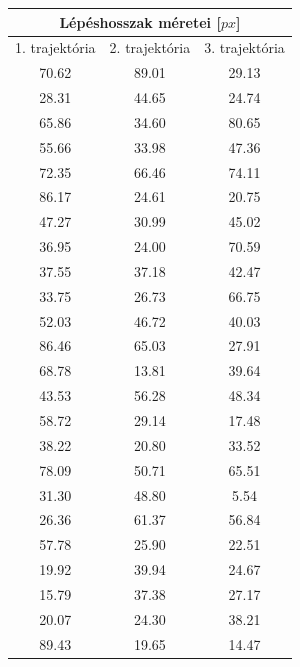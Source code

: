\label{tab:1}
\begin{multicols}{2}
\begin{tabular}{||c|c|c||}
    \toprule
    \multicolumn{3}{||c||}{Lépéshosszak méretei [$px$]} \\
    \hline
    1. trajektória  & 2. trajektória  & 3. trajektória \\ \hline \hline
    70.62           & 89.01           & 29.13          \\ \hline
    28.31           & 44.65           & 24.74          \\ \hline
    65.86           & 34.60           & 80.65          \\ \hline
    55.66           & 33.98           & 47.36          \\ \hline
    72.35           & 66.46           & 74.11          \\ \hline
    86.17           & 24.61           & 20.75          \\ \hline
    47.27           & 30.99           & 45.02          \\ \hline
    36.95           & 24.00           & 70.59          \\ \hline
    37.55           & 37.18           & 42.47          \\ \hline
    33.75           & 26.73           & 66.75          \\ \hline
    52.03           & 46.72           & 40.03          \\ \hline
    86.46           & 65.03           & 27.91          \\ \hline
    68.78           & 13.81           & 39.64          \\ \hline
    43.53           & 56.28           & 48.34          \\ \hline
    58.72           & 29.14           & 17.48          \\ \hline
    38.22           & 20.80           & 33.52          \\ \hline
    78.09           & 50.71           & 65.51          \\ \hline
    31.30           & 48.80           & 5.54           \\ \hline
    26.36           & 61.37           & 56.84          \\ \hline
    57.78           & 25.90           & 22.51          \\ \hline
    19.92           & 39.94           & 24.67          \\ \hline
    15.79           & 37.38           & 27.17          \\ \hline
    20.07           & 24.30           & 38.21          \\ \hline
    89.43           & 19.65           & 14.47          \\
    \bottomrule
\end{tabular}


\end{multicols}
